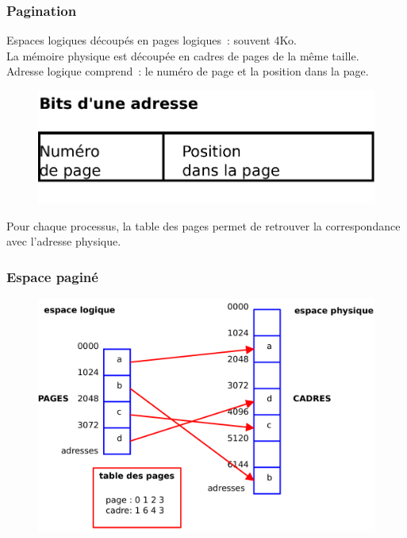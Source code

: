 \begin{frame}
\frametitle{Pagination}
Espaces logiques découpés en \alert{pages logiques}~: souvent 4Ko.\\
\vspace{0.3cm}
La mémoire physique est découpée en \alert{cadres de pages} de la même taille.\\
\vspace{0.3cm}
Adresse logique comprend~: le numéro de page et la position dans la page. 
\begin{figure}
  \includegraphics[width=0.5\linewidth]{fig2/format-pagination}
\end{figure}
Pour chaque processus, la \alert{table des pages} permet de retrouver la
correspondance avec l'adresse physique.
\end{frame}

\begin{frame}
\frametitle{Espace paginé}
\begin{figure}
  \includegraphics[width=\linewidth]{fig2/pagination}
\end{figure}
\end{frame}

